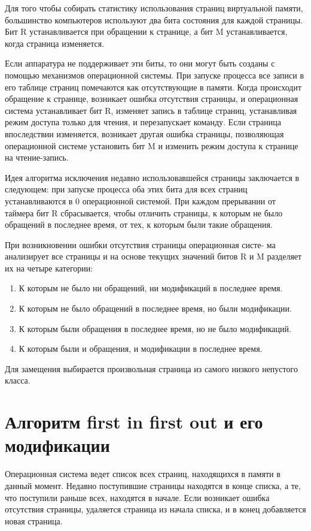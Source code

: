 Для того чтобы собирать статистику использования страниц виртуальной памяти, большинство компьютеров используют два бита состояния для
каждой страницы. Бит R устанавливается при обращении к странице, а бит
M устанавливается, когда страница изменяется.

Если аппаратура не поддерживает эти биты, то они могут быть созданы
с помощью механизмов операционной системы. При запуске процесса все
записи в его таблице страниц помечаются как отсутствующие в памяти. Когда
происходит обращение к странице, возникает ошибка отсутствия страницы,
и операционная система устанавливает бит R, изменяет запись в таблице
страниц, устанавливая режим доступа только для чтения, и перезапускает
команду. Если страница впоследствии изменяется, возникает другая ошибка
страницы, позволяющая операционной системе установить бит M и изменить
режим доступа к странице на чтение-запись.

Идея алгоритма исключения недавно использовавшейся страницы заключается в следующем: при запуске процесса оба этих бита для всех страниц
устанавливаются в 0 операционной системой. При каждом прерывании от
таймера бит R сбрасывается, чтобы отличить страницы, к которым не было
обращений в последнее время, от тех, к которым были такие обращения.

При возникновении ошибки отсутствия страницы операционная систе-
ма анализирует все страницы и на основе текущих значений битов R и M
разделяет их на четыре категории:
\begin{enumerate}
	\item К которым не было ни обращений, ни модификаций в последнее время.
	\item К которым не было обращений в последнее время, но были модификации.
	\item К которым были обращения в последнее время, но не было модификаций.
	\item К которым были и обращения, и модификации в последнее время.
\end{enumerate}

Для замещения выбирается произвольная страница из самого низкого непустого класса.

\section{Алгоритм first in first out и его модификации}

Операционная система ведет список всех страниц, находящихся в памяти в данный момент. Недавно поступившие страницы находятся в конце
списка, а те, что поступили раньше всех, находятся в начале. Если возникает
ошибка отсутствия страницы, удаляется страница из начала списка, и в конец
добавляется новая страница.


